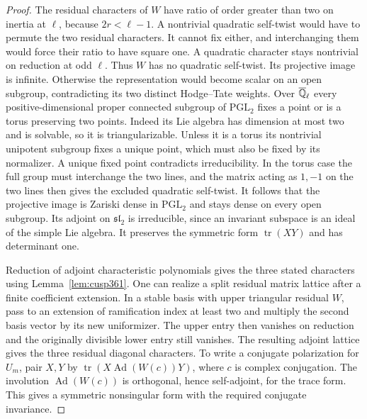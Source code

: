\documentclass[a4paper,11pt]{article}
\theoremstyle{definition}
\theoremstyle{remark}
\numberwithin{equation}{section}
\begin{document}
\begin{proof}
The residual characters of \(W\) have ratio of order greater than
two on inertia at \(\ell\), because \(2r<\ell-1\).
A nontrivial quadratic self-twist would have to permute the two
residual characters. It cannot fix either, and interchanging
them would force their ratio to have square one. A quadratic
character stays nontrivial on reduction at odd \(\ell\). Thus
\(W\) has no quadratic self-twist. Its projective image is infinite. Otherwise the representation
would become scalar on an open subgroup, contradicting its two
distinct Hodge--Tate weights. Over \(\overline{\mathbb Q}_\ell\) every
positive-dimensional proper connected subgroup of
\(\mathrm{PGL}_2\) fixes a point or is a torus preserving two
points. Indeed its Lie algebra has dimension at most two and is
solvable, so it is triangularizable. Unless it is a torus its
nontrivial unipotent subgroup fixes a unique point, which must
also be fixed by its normalizer. A unique fixed point contradicts
irreducibility. In the torus case the full group must interchange
the two lines, and the matrix acting as \(1,-1\) on the two lines
then gives the excluded quadratic self-twist. It follows that
the projective image is Zariski dense in \(\mathrm{PGL}_2\) and
stays dense on every open subgroup. Its adjoint on
\(\mathfrak{sl}_2\) is irreducible, since an invariant subspace
is an ideal of the simple Lie algebra. It preserves the
symmetric form \(\operatorname{tr}(XY)\) and has determinant one.

Reduction of adjoint characteristic polynomials gives the three
stated characters using Lemma~\ref{lem:cusp361}. One can realize a
split residual matrix lattice after a finite coefficient extension.
In a stable basis with upper triangular residual \(W\), pass to an
extension of ramification index at least two and multiply the
second basis vector by its new uniformizer. The upper entry then
vanishes on reduction and the originally divisible lower entry
still vanishes. The resulting adjoint lattice gives the three
residual diagonal characters. To write a conjugate polarization
for \(U_m\), pair \(X,Y\) by
\(\operatorname{tr}(X\operatorname{Ad}(W(c))Y)\), where \(c\) is
complex conjugation. The involution \(\operatorname{Ad}(W(c))\)
is orthogonal, hence self-adjoint, for the trace form. This gives
a symmetric nonsingular form with the required conjugate invariance.


\end{proof}
\end{document}
